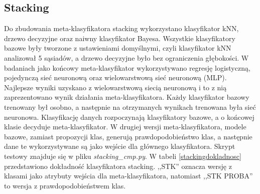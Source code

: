\subsection{Stacking}
Do zbudowania meta-klasyfikatora stacking wykorzystano klasyfikator kNN, drzewo decyzyjne oraz naiwny klasyfikator Bayesa. Wszystkie klasyfikatory bazowe były tworzone z ustawieniami domyślnymi, czyli klasyfikator kNN analizował 5 sąsiadów, a drzewo decyzyjne było bez ograniczenia głębokości. W badaniach jako końcowy meta-klasyfikator wykorzystywano regresję logistyczną, pojedynczą sieć neuronową oraz wielowarstwową sieć neuronową (MLP). Najlepsze wyniki uzyskano z wielowarstwową siecią neuronową i to z nią zaprezentowano wynik działania meta-klasyfikatora. Każdy klasyfikator bazowy trenowany był osobno, a następnie na otrzymanych wynikach trenowana była sieć neuronowa. Klasyfikację danych rozpoczynają klasyfikatory bazowe, a o końcowej klasie decyduje meta-klasyfikator. W drugiej wersji meta-klasyfikatora, modele bazowe, zamiast propozycji klas, generują prawdopodobieństwo klas, a następnie dane te wykorzystywane są jako wejście dla głównego klasyfikatora. Skrypt testowy znajduje się w pliku \textit{stacking\_cmp.py}. W tabeli \ref{stackingdokladnosc} przedstawiono dokładność klasyfikatora stacking. ,,STK'' oznacza wersję z klasami jako atrybuty wejścia dla meta-klasyfikatora, natomiast ,,STK PROBA'' to wersja z prawdopodobieństwem klas. 
